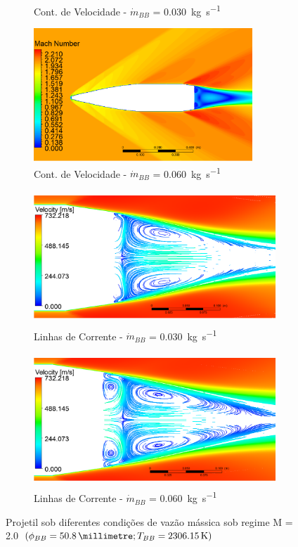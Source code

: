 \begin{figure}[!ht]
\begin{subfigure}[b]{0.47\textwidth}
        \caption{Cont. de Velocidade - \(\Dot{m}_{BB}\) = \qty{0,030}{\kilogram\per\second}}
        \label{fig:contorno-velocidade-bb-2pol-vazao-0030}
    \end{subfigure}
    \hfill
	\begin{subfigure}[b]{0.47\textwidth}
        \centering
        \includegraphics[height=5cm,width=\textwidth]{contorno-velocidade-2306K-vazao-0060-2pol.png}
        \caption{Cont. de Velocidade - \(\Dot{m}_{BB}\) = \qty{0,060}{\kilogram\per\second}}
        \label{fig:contorno-velocidade-bb-2pol-vazao-0060}
    \end{subfigure}
	\hfill
	\begin{subfigure}[b]{0.47\textwidth}
        \centering
        \includegraphics[height=5cm,width=\textwidth]{corrente-velocidade-2306K-vazao-0030-2pol.png}
        \caption{Linhas de Corrente - \(\Dot{m}_{BB}\) = \qty{0,030}{\kilogram\per\second}}
        \label{fig:corrente-velocidade-bb-2pol-vazao-0030}
    \end{subfigure}
    \hfill
    \begin{subfigure}[b]{0.47\textwidth}
        \centering
        \includegraphics[height=5cm,width=\textwidth]{corrente-velocidade-2306K-vazao-0060-2pol.png}
        \caption{Linhas de Corrente - \(\Dot{m}_{BB}\) = \qty{0,060}{\kilogram\per\second}}
	\label{fig:corrente-velocidade-bb-2pol-vazao-0060}
    \end{subfigure}
	\caption{Projetil sob diferentes condições de vazão mássica sob regime M = \num{2,0} \(\left(\phi_{BB} = \qty{50,8}{\millimetre}; T_{BB} = \qty{2306,15}{\kelvin}\right)\)}
	\label{fig:influencia-diametro-vazao-2pol}
\end{figure}

